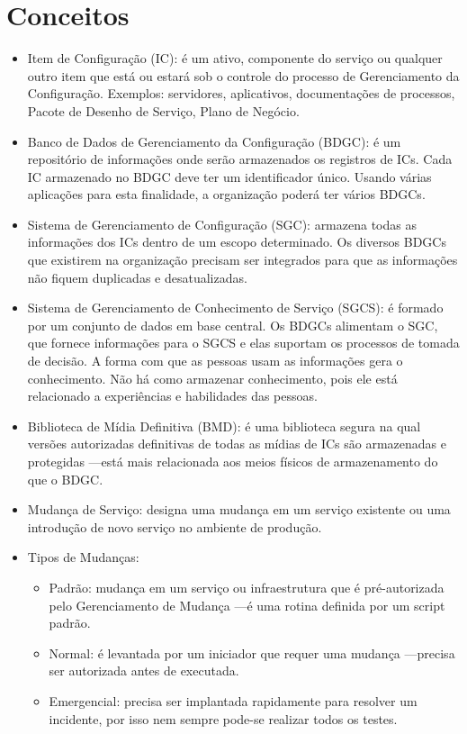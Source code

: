 \section{Conceitos}
\begin{itemize}
    \item Item de Configuração (IC): é um ativo, componente do serviço ou
        qualquer outro item que está ou estará sob o controle do processo de
        Gerenciamento da Configuração. Exemplos: servidores, aplicativos,
        documentações de processos, Pacote de Desenho de Serviço, Plano de
        Negócio.
    \item Banco de Dados de Gerenciamento da Configuração (BDGC): é um
        repositório de informações onde serão armazenados os registros de ICs.
        Cada IC armazenado no BDGC deve ter um identificador único. Usando
        várias aplicações para esta finalidade, a organização poderá ter vários
        BDGCs.
    \item Sistema de Gerenciamento de Configuração (SGC): armazena todas as
        informações dos ICs dentro de um escopo determinado. Os diversos BDGCs
        que existirem na organização precisam ser integrados para que as
        informações não fiquem duplicadas e desatualizadas.
    \item Sistema de Gerenciamento de Conhecimento de Serviço (SGCS): é formado
        por um conjunto de dados em base central. Os BDGCs alimentam o SGC, que
        fornece informações para o SGCS e elas suportam os processos de tomada
        de decisão. A forma com que as pessoas usam as informações gera o
        conhecimento. Não há como armazenar conhecimento, pois ele está
        relacionado a experiências e habilidades das pessoas.
    \item Biblioteca de Mídia Definitiva (BMD): é uma biblioteca segura na qual
        versões autorizadas definitivas de todas as mídias de ICs são
        armazenadas e protegidas ---está mais relacionada aos meios físicos de
        armazenamento do que o BDGC.
    \item Mudança de Serviço: designa uma mudança em um serviço existente ou
        uma introdução de novo serviço no ambiente de produção.
	\item Tipos de Mudanças:
        \begin{itemize}
            \item Padrão: mudança em um serviço ou infraestrutura que é
                pré-autorizada pelo Gerenciamento de Mudança ---é uma rotina
                definida por um script padrão.
            \item Normal: é levantada por um iniciador que requer uma mudança
                ---precisa ser autorizada antes de executada.
            \item Emergencial: precisa ser implantada rapidamente para resolver
                um incidente, por isso nem sempre pode-se realizar todos os
                testes.
        \end{itemize}


\end{itemize}
